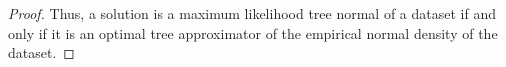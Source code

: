 \begin{proposition}
\begin{proof}
Thus, a solution is a maximum likelihood tree normal of a dataset if and only if it is an optimal tree approximator of the empirical normal density of the dataset.


\end{proof}\end{proposition}